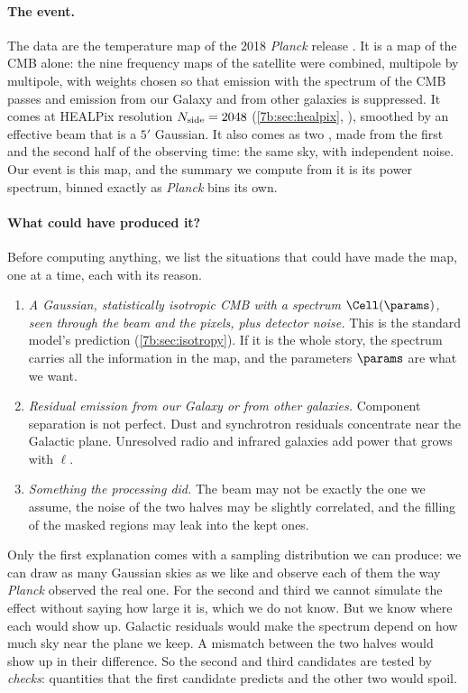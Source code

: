 \paragraph{The event.} The data are the  temperature map of the 2018 \textit{Planck}
release \cite{Planck2018I}. It is a map of the CMB alone: the nine frequency maps of the satellite were
combined, multipole by multipole, with weights chosen so that emission with the spectrum of the CMB passes
and emission from our Galaxy and from other galaxies is suppressed. It comes at HEALPix resolution
$N_{\rm side}=2048$ 
(\cref{7b:sec:healpix}, \cite{Gorski2005}), smoothed by an effective beam that is a $5'$ Gaussian. It also comes as two
, made from the first and the second half of the observing time: the same sky,
with independent noise. Our event is this map, and the summary we compute from it is its power spectrum,
binned exactly as \textit{Planck} bins its own.

\paragraph{What could have produced it?} Before computing anything, we list the situations that could have
made the map, one at a time, each with its reason.
\begin{enumerate}[itemsep=2pt,leftmargin=1.5em]
  \item \emph{A Gaussian, statistically isotropic CMB with a spectrum $\Cell(\params)$, seen through the beam and
        the pixels, plus detector noise.} This is the standard model's prediction (\cref{7b:sec:isotropy}).
        If it is the whole story, the spectrum carries all the information in the map, and the
        parameters $\params$ are what we want.
  \item \emph{Residual emission from our Galaxy or from other galaxies.} Component separation is not
        perfect. Dust and synchrotron residuals concentrate near the Galactic plane. Unresolved radio and
        infrared galaxies add power that grows with $\ell$.
  \item \emph{Something the processing did.} The beam may not be exactly the one we assume, the noise of
        the two halves may be slightly correlated, and the filling of the masked regions may leak into the
        kept ones.
\end{enumerate}
Only the first explanation comes with a sampling distribution we can produce: we can draw as many Gaussian
skies as we like and observe each of them the way \textit{Planck} observed the real one. For the second and
third we cannot simulate the effect without saying how large it is, which we do not know. But we know where
each would show up. Galactic residuals would make the spectrum depend on how much sky near the plane we keep.
A mismatch between the two halves would show up in their difference. So the second and third candidates
are tested by \emph{checks}: quantities that the first candidate predicts and the other two would spoil.

